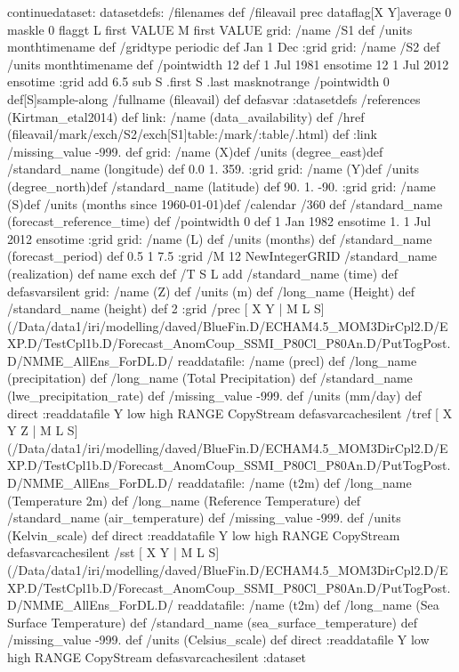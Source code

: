 \begin{ingrid}
continuedataset:
datasetdefs:
/filenames {
} def
/fileavail {
prec dataflag[X Y]average 0 maskle 0 flaggt L first VALUE M first VALUE grid: /name /S1 def /units monthtimename def /gridtype periodic def Jan 1 Dec :grid grid: /name /S2 def /units monthtimename def /pointwidth 12 def 1 Jul 1981 ensotime 12 1 Jul 2012 ensotime :grid add 6.5 sub S .first S .last masknotrange /pointwidth 0 def[S]sample-along /fullname (fileavail) def
} defasvar
:datasetdefs
/references (Kirtman_etal2014) def
link:
/name (data_availability) def
/href (fileavail/mark/exch/S2/exch[S1]table:/mark/:table/.html) def 
:link
 /missing_value -999. def
grid:
/name (X)def
/units (degree_east)def
/standard_name (longitude) def
 0.0 1. 359.
:grid
grid:
/name (Y)def
/units (degree_north)def
/standard_name (latitude) def
 90. 1. -90.
:grid
grid:
/name (S)def
/units (months since 1960-01-01)def
/calendar /360 def
/standard_name (forecast_reference_time) def
/pointwidth 0 def
1 Jan 1982 ensotime
1. 
1 Jul 2012 ensotime %
:grid
grid:
/name (L) def
/units (months) def
/standard_name (forecast_period) def
0.5 1 7.5
:grid
/M 12 NewIntegerGRID
/standard_name (realization) def
name exch def
/T { S L add
/standard_name (time) def } defasvarsilent
grid:
/name (Z) def
/units (m) def
/long_name (Height) def
/standard_name (height) def
2 :grid
 /prec{
[ X Y | M L S] 
(/Data/data1/iri/modelling/daved/BlueFin.D/ECHAM4.5_MOM3DirCpl2.D/EXP.D/TestCpl1b.D/Forecast_AnomCoup_SSMI_P80Cl_P80An.D/PutTogPost.D/NMME_AllEns_ForDL.D/%
readdatafile:
/name (precl) def
 /long_name (precipitation) def
/long_name (Total Precipitation) def
/standard_name (lwe_precipitation_rate) def
 /missing_value -999. def
/units (mm/day) def
 direct :readdatafile
Y low high RANGE
CopyStream
}defasvarcachesilent
 /tref{
[ X Y Z | M L S] 
(/Data/data1/iri/modelling/daved/BlueFin.D/ECHAM4.5_MOM3DirCpl2.D/EXP.D/TestCpl1b.D/Forecast_AnomCoup_SSMI_P80Cl_P80An.D/PutTogPost.D/NMME_AllEns_ForDL.D/%
readdatafile:
/name (t2m) def
 /long_name (Temperature 2m) def
/long_name (Reference Temperature) def
/standard_name (air_temperature) def
 /missing_value -999. def
/units (Kelvin_scale) def
 direct :readdatafile
Y low high RANGE
CopyStream
}defasvarcachesilent
 /sst{
[ X Y | M L S] 
(/Data/data1/iri/modelling/daved/BlueFin.D/ECHAM4.5_MOM3DirCpl2.D/EXP.D/TestCpl1b.D/Forecast_AnomCoup_SSMI_P80Cl_P80An.D/PutTogPost.D/NMME_AllEns_ForDL.D/%
readdatafile:
/name (t2m) def
 /long_name (Sea Surface Temperature) def
/standard_name (sea_surface_temperature) def
 /missing_value -999. def
/units (Celsius_scale) def
 direct :readdatafile
Y low high RANGE
CopyStream
}defasvarcachesilent
:dataset
\end{ingrid}
